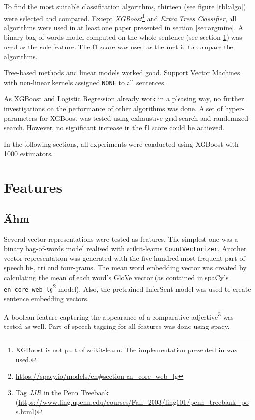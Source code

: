 To find the most suitable classification algorithms, thirteen (see figure \ref{tbl:algo}) were selected and compared. Except \emph{XGBoost}\footnote{XGBoost is not part of scikit-learn. The implementation presented in \cite{DBLP:journals/corr/ChenG16} was used.} and \emph{Extra Trees Classifier}, all algorithms were used in at least one paper presented in section \ref{sec:argmine}. A binary bag-of-words model computed on the whole sentence (see section \ref{sec:features}) was used as the sole feature. The f1 score was used as the metric to compare the algorithms. 

Tree-based methods and linear models worked good. Support Vector Machines with non-linear kernels assigned \texttt{NONE} to all sentences.

As XGBoost and Logistic Regression already work in a pleasing way, no further investigations on the performance of other algorithms was done. A set of hyper-parameters for XGBoost was tested using exhaustive grid search and randomized search. However, no significant increase in the f1 score could be achieved.

In the following sections, all experiments were conducted using XGBoost with 1000 estimators.


\section{Features}
\label{sec:features}
\subsection{Ähm}
Several vector representations were tested as features. The simplest one was a binary bag-of-words model realised with scikit-learns \texttt{CountVectorizer}. Another vector representation was generated with the five-hundred most frequent part-of-speech bi-, tri and four-grams. The mean word embedding vector was created by calculating the mean of each word's GloVe vector (as contained in spaCy's \texttt{en\_core\_web\_lg}\footnote{\url{https://spacy.io/models/en\#section-en\_core\_web\_lg}} model). Also, the pretrained InferSent model was used to create sentence embedding vectors.

A boolean feature capturing the appearance of a comparative adjective\footnote{Tag \emph{JJR} in the Penn Treebank (\url{https://www.ling.upenn.edu/courses/Fall\_2003/ling001/penn\_treebank\_pos.html})} was tested as well. Part-of-speech tagging for all features was done using spacy.\newline


